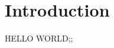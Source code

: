 \documentclass[../main/ivr-coinsy.tex]{subfiles}
\begin{document}
\section{Introduction}
  HELLO WORLD;;
\end{document}
